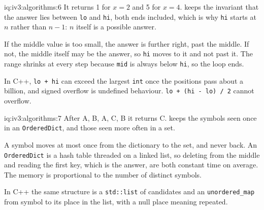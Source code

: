 \begin{solution}{iq:iv3:algorithms:6}
It returns 1 for $x = 2$ and 5 for $x = 4$.  keeps the invariant that the answer lies between \texttt{lo} and \texttt{hi}, both ends included, which is why \texttt{hi} starts at $n$ rather than $n - 1$: $n$ itself is a possible answer.
\label{lst:iv3:al:lowerbound}

If the middle value is too small, the answer is further right, past the middle. If not, the middle itself may be the answer, so \texttt{hi} moves to it and not past it. The range shrinks at every step because \texttt{mid} is always below \texttt{hi}, so the loop ends.

In C++, \texttt{lo + hi} can exceed the largest \texttt{int} once the positions pass about a billion, and signed overflow is undefined behaviour. \texttt{lo + (hi - lo) / 2} cannot overflow.

\end{solution}

\begin{solution}{iq:iv3:algorithms:7}
After A, B, A, C, B it returns C.  keeps the symbols seen once in an \texttt{OrderedDict}, and those seen more often in a set.
\label{lst:iv3:al:firstunique}

A symbol moves at most once from the dictionary to the set, and never back. An \texttt{OrderedDict} is a hash table threaded on a linked list, so deleting from the middle and reading the first key, which is the answer, are both constant time on average. The memory is proportional to the number of distinct symbols.

In C++ the same structure is a \texttt{std::list} of candidates and an \texttt{unordered\_map} from symbol to its place in the list, with a null place meaning repeated.

\end{solution}

